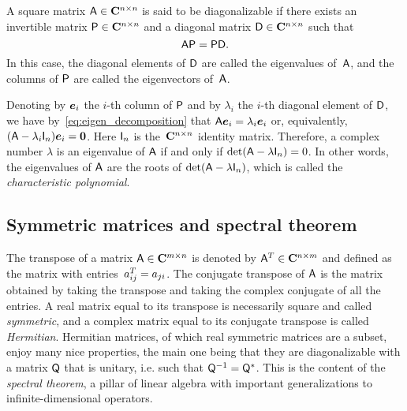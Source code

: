 \begin{definition}
    \label{definition:diagonalizable}
    A square matrix $\mathsf A \in \mathbf C^{n \times n}$ is said to be diagonalizable if there exists an invertible matrix $\mathsf P \in \mathbf C^{n \times n}$
    and a diagonal matrix $\mathsf D \in \mathbf C^{n \times n}$ such that
    \begin{equation}
        \label{eq:eigen_decomposition}
        \mathsf A \mathsf P = \mathsf P \mathsf D.
    \end{equation}
    In this case,
    the diagonal elements of $\mathsf D$ are called the eigenvalues of~$\mathsf A$,
    and the columns of $\mathsf P$ are called the eigenvectors of~$\mathsf A$.
\end{definition}
Denoting by $\mathbf{\boldsymbol{e}}_i$ the $i$-th column of $\mathsf P$ and by $\lambda_i$ the $i$-th diagonal element of $\mathsf D$,
we have by~\eqref{eq:eigen_decomposition} that $\mathsf A \mathbf{\boldsymbol{e}}_i = \lambda_i \mathbf{\boldsymbol{e}}_i$ or,
equivalently, $(\mathsf A - \lambda_i \mathsf I_n) \mathbf{\boldsymbol{e}}_i = \mathbf{\boldsymbol{0}}$.
Here $\mathsf I_n$ is the~$\mathbf C^{n \times n}$ identity matrix.
Therefore, a complex number $\lambda$ is an eigenvalue of $\mathsf A$ if and only if $\det(\mathsf A - \lambda \mathsf I_n) = 0$.
In other words, the eigenvalues of $\mathsf A$ are the roots of $\det(\mathsf A - \lambda \mathsf I_n)$,
which is called the \emph{characteristic polynomial}.

\subsection*{Symmetric matrices and spectral theorem}%
The transpose of a matrix $\mathsf A \in \mathbf C^{m \times n}$ is denoted by $\mathsf A^T \in \mathbf C^{n \times m}$
and defined as the matrix with entries~$a^T_{ij} = a_{ji}$.
The conjugate transpose of $\mathsf A$ is the matrix obtained by taking the transpose and taking the complex conjugate of all the entries.
A real matrix equal to its transpose is necessarily square and called \emph{symmetric},
and a complex matrix equal to its conjugate transpose is called \emph{Hermitian}.
Hermitian matrices, of which real symmetric matrices are a subset,
enjoy many nice properties,
the main one being that they are diagonalizable with a matrix $\mathsf Q$ that is unitary,
i.e. such that $\mathsf Q^{-1} = \mathsf Q^*$.
This is the content of the \emph{spectral theorem},
a pillar of linear algebra with important generalizations to infinite-dimensional operators.

